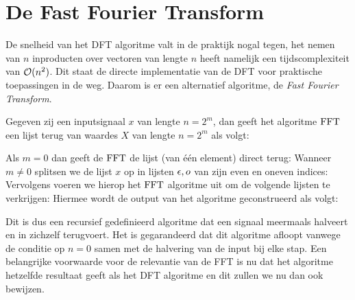 \section{De Fast Fourier Transform}
De snelheid van het DFT algoritme valt in de praktijk nogal tegen, het nemen van $n$ inproducten over vectoren 
van lengte $n$ heeft namelijk een tijdscomplexiteit van $\mathcal{O}(n^2)$. Dit staat de directe implementatie van de DFT 
voor praktische toepassingen in de weg. Daarom is er een alternatief algoritme, de \emph{Fast Fourier Transform}.  \bigskip

\begin{algo}
Gegeven zij een inputsignaal $x$ van lengte $n=2^m$, dan geeft het algoritme $\text{FFT}$ 
een lijst terug van waardes $X$ van lengte $n=2^m$ als volgt:

Als $m=0$ dan geeft de $\text{FFT}$ de lijst (van \'e\'en element) direct terug:
Wanneer $m\neq0$ splitsen we de lijst $x$ op in lijsten $\epsilon,o$ van zijn even en oneven indices:
Vervolgens voeren we hierop het $\text{FFT}$ algoritme uit om de volgende lijsten te verkrijgen:
Hiermee wordt de output van het algoritme geconstrueerd als volgt:
\end{algo}

Dit is dus een recursief gedefinieerd algoritme dat een signaal meermaals halveert en in zichzelf terugvoert.
Het is gegarandeerd dat dit algoritme afloopt vanwege de conditie op $n=0$ samen met de halvering van de input bij elke stap. Een belangrijke voorwaarde voor de relevantie van de FFT is nu dat het algoritme hetzelfde resultaat geeft als het DFT algoritme en dit zullen we nu dan ook bewijzen. 

